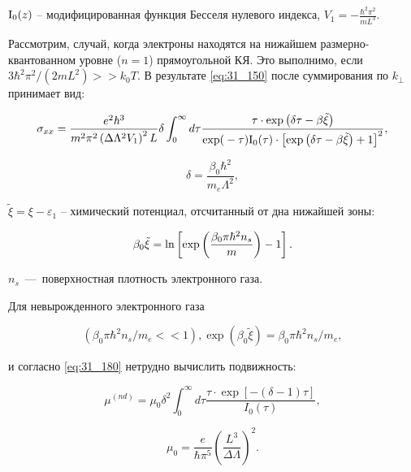 \noindent ${\rm I}_{0} (z)$ -- модифицированная функция Бесселя нулевого индекса, $V_{1} =-\frac{\hbar ^{2} \pi ^{2} }{mL^{3} } $.

Рассмотрим, случай, когда электроны находятся на нижайшем размерно-квантованном уровне ($n=1$) прямоугольной КЯ. Это выполнимо, если $3\hbar ^{2} \pi ^{2} /\left(2mL^{2} \right)>>k_{0} T$. В результате \eqref{eq:31_150} после суммирования по $k_{\bot } $ принимает вид:

\begin{equation} \label{eq:31_180}
\sigma _{xx} =\frac{e^{2} \hbar ^{3} }{m^{2} \pi ^{2} \left(\Delta \Lambda ^{2} V_{1} \right)^{2} L} \delta \int _{0}^{\infty }d\tau \frac{\tau \cdot {\rm exp}\left(\delta \tau -\beta \tilde{\xi }\right)}{{\rm exp(}-\tau ){\rm I}_{{\rm 0}} (\tau )\cdot \left[{\rm exp}\left(\delta \tau -\beta \tilde{\xi }\right)+1\right]^{2} },
\end{equation}

\[
\delta =\frac{\beta _{0} \hbar ^{2} }{m_{e} \Lambda ^{2} },
\] 

$\tilde{\xi }=\xi -\varepsilon _{1} $ -- химический потенциал, отсчитанный от дна нижайшей зоны:

\begin{equation} \label{eq:31_190}
\beta _{0} \tilde{\xi }={\rm ln}\left[{\rm exp}\left(\frac{\beta _{0} \pi \hbar ^{2} n_{s} }{m} \right)-1\right].
\end{equation}

\noindent  $n_{s} $~---~поверхностная плотность электронного газа.

Для невырожденного электронного газа

$$\left(\beta _{0} \pi \hbar ^{2} n_{s} /m_{e} <<1\right), {\exp}\left(\beta _{0} \tilde{\xi }\right)=\beta _{0} \pi \hbar ^{2} n_{s} /m_{e}, $$

\noindent и согласно \eqref{eq:31_180} нетрудно вычислить подвижность:

\begin{equation} \label{eq:31_200}
\mu ^{(nd)} =\mu _{0} \delta ^{2} \int _{0}^{\infty }d\tau \frac{\tau \cdot \exp \left[-\left(\delta -1\right)\tau \right]}{I_{0} (\tau )},
\end{equation}

\[
\mu _{0} =\frac{e}{\hbar \pi ^{5} } \left(\frac{L^{3} }{\Delta \Lambda } \right)^{2}.
\] 


